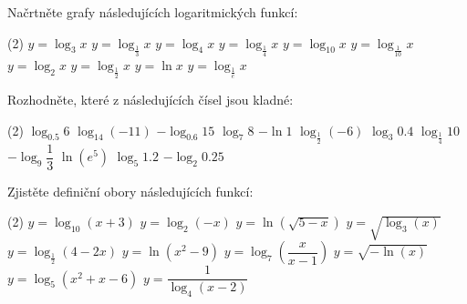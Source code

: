 \documentclass[12pt,a4paper]{article}
\begin{document}
\exercisepart
\setcounter{section}{1}

\begin{exercise}
    Načrtněte grafy následujících logaritmických funkcí:
    \begin{tasks}(2)
        \task $y = \log_3 x$
        \task $y = \log_{\frac13} x$
        \task $y = \log_4 x$
        \task $y = \log_{\frac14} x$
        \task $y = \log_{10} x$
        \task $y = \log_{\frac1{10}} x$
        \task $y = \log_2 x$
        \task $y = \log_{\frac12} x$
        \task $y = \ln x$
        \task $y = \log_{\frac1e} x$
    \end{tasks}
\end{exercise}


\begin{exercise}
    Rozhodněte, které z následujících čísel jsou kladné:
    \begin{tasks}(2)
        \task $\log_{0.5} 6$
        \task $\log_{14} (-11)$
        \task $-\log_{0.6} 15$
        \task $\log_7 8$
        \task $-\ln 1$
        \task $\log_{\frac12} (-6)$
        \task $\log_3 0.4$
        \task $\log_{\frac14} 10$
        \task $-\log_{9} \dfrac{1}{3}$
        \task $\ln (e^5)$
        \task $\log_5 1.2$
        \task $-\log_{2} 0.25$
    \end{tasks}
\end{exercise}


\begin{exercise}
    Zjistěte definiční obory následujících funkcí:
    \begin{tasks}(2)
        \task $y = \log_{10}(x + 3)$
        \task $y = \log_2(-x)$
        \task $y = \ln\left(\sqrt{5 - x}\right)$
        \task $y = \sqrt{\log_3(x)}$
        \task $y = \log_{\frac12}(4 - 2x)$
        \task $y = \ln(x^2 - 9)$
        \task $y = \log_7\left(\dfrac{x}{x - 1}\right)$
        \task $y = \sqrt{-\ln(x)}$
        \task $y = \log_5(x^2 + x - 6)$
        \task $y = \dfrac{1}{\log_4(x - 2)}$
    \end{tasks}
\end{exercise}
\end{document}
